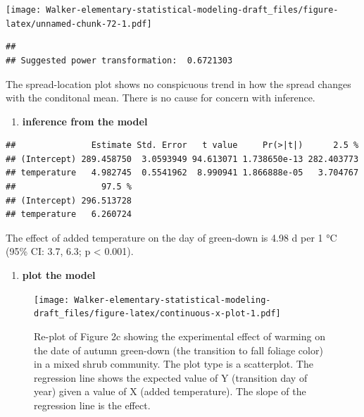 \documentclass[]{book}
\newenvironment{Shaded}{\begin{snugshade}}{\end{snugshade}}
\newcommand{\KeywordTok}[1]{\textcolor[rgb]{0.13,0.29,0.53}{\textbf{#1}}}
\newcommand{\NormalTok}[1]{#1}
\newcommand{\OperatorTok}[1]{\textcolor[rgb]{0.81,0.36,0.00}{\textbf{#1}}}
\newcommand{\StringTok}[1]{\textcolor[rgb]{0.31,0.60,0.02}{#1}}
\providecommand{\tightlist}{%
  \setlength{\itemsep}{0pt}\setlength{\parskip}{0pt}}
\begin{document}
\texttt{[image: Walker-elementary-statistical-modeling-draft\_files/figure-latex/unnamed-chunk-72-1.pdf]}

\begin{verbatim}
## 
## Suggested power transformation:  0.6721303
\end{verbatim}

The spread-location plot shows no conspicuous trend in how the spread changes with the conditonal mean. There is no cause for concern with inference.

\begin{enumerate}
\def\labelenumi{\arabic{enumi}.}
\setcounter{enumi}{4}
\tightlist
\item
  \textbf{inference from the model}
\end{enumerate}

\begin{Shaded}
\end{Shaded}

\begin{verbatim}
##               Estimate Std. Error   t value     Pr(>|t|)      2.5 %
## (Intercept) 289.458750  3.0593949 94.613071 1.738650e-13 282.403773
## temperature   4.982745  0.5541962  8.990941 1.866888e-05   3.704767
##                 97.5 %
## (Intercept) 296.513728
## temperature   6.260724
\end{verbatim}

The effect of added temperature on the day of green-down is 4.98 d per 1 °C (95\% CI: 3.7, 6.3; p \textless{} 0.001).

\begin{enumerate}
\def\labelenumi{\arabic{enumi}.}
\setcounter{enumi}{5}
\tightlist
\item
  \textbf{plot the model}
\end{enumerate}

\begin{figure}
\centering
\texttt{[image: Walker-elementary-statistical-modeling-draft\_files/figure-latex/continuous-x-plot-1.pdf]}
\caption{\label{fig:continuous-x-plot}Re-plot of Figure 2c showing the experimental effect of warming on the date of autumn green-down (the transition to fall foliage color) in a mixed shrub community. The plot type is a scatterplot. The regression line shows the expected value of Y (transition day of year) given a value of X (added temperature). The slope of the regression line is the effect.}
\end{figure}
\end{document}
